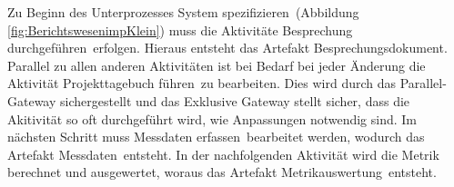 Zu Beginn des Unterprozesses \grqq System spezifizieren\grqq \  (Abbildung \ref{fig:BerichtswesenimpKlein}) muss die Aktivitäte \grqq Besprechung durchgeführen\grqq \  erfolgen. Hieraus entsteht das Artefakt \grqq Besprechungsdokument\grqq.\newline
Parallel zu allen anderen Aktivitäten ist bei Bedarf bei jeder Änderung die Aktivität \grqq Projekttagebuch führen\grqq \ zu bearbeiten. Dies wird durch das Parallel-Gateway sichergestellt und das Exklusive Gateway stellt sicher, dass die Akitivität so oft durchgeführt wird, wie Anpassungen notwendig sind. \newline
Im nächsten Schritt muss \grqq Messdaten erfassen\grqq \ bearbeitet werden, wodurch das Artefakt \grqq Messdaten\grqq \ entsteht.
In der nachfolgenden Aktivität wird die \grqq Metrik berechnet und ausgewertet\grqq, woraus das Artefakt \grqq Metrikauswertung\grqq \  entsteht.
